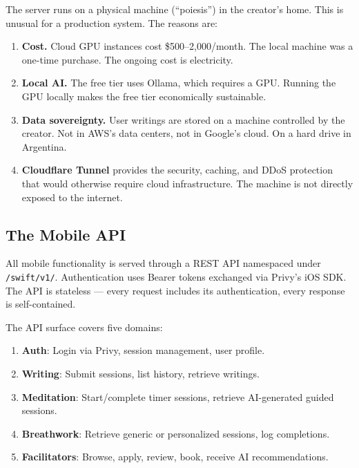 \documentclass[12pt, a4paper]{article}
\begin{document}
The server runs on a physical machine (``poiesis'') in the creator's home. This is unusual for a production system. The reasons are:

\begin{enumerate}[leftmargin=2cm]
    \item \textbf{Cost.} Cloud GPU instances cost \$500--2,000/month. The local machine was a one-time purchase. The ongoing cost is electricity.

    \item \textbf{Local AI.} The free tier uses Ollama, which requires a GPU. Running the GPU locally makes the free tier economically sustainable.

    \item \textbf{Data sovereignty.} User writings are stored on a machine controlled by the creator. Not in AWS's data centers, not in Google's cloud. On a hard drive in Argentina.

    \item \textbf{Cloudflare Tunnel} provides the security, caching, and DDoS protection that would otherwise require cloud infrastructure. The machine is not directly exposed to the internet.
\end{enumerate}

\subsection{The Mobile API}

All mobile functionality is served through a REST API namespaced under \texttt{/swift/v1/}. Authentication uses Bearer tokens exchanged via Privy's iOS SDK. The API is stateless --- every request includes its authentication, every response is self-contained.

The API surface covers five domains:

\begin{enumerate}[leftmargin=2cm]
    \item \textbf{Auth}: Login via Privy, session management, user profile.
    \item \textbf{Writing}: Submit sessions, list history, retrieve writings.
    \item \textbf{Meditation}: Start/complete timer sessions, retrieve AI-generated guided sessions.
    \item \textbf{Breathwork}: Retrieve generic or personalized sessions, log completions.
    \item \textbf{Facilitators}: Browse, apply, review, book, receive AI recommendations.
\end{enumerate}
\end{document}
